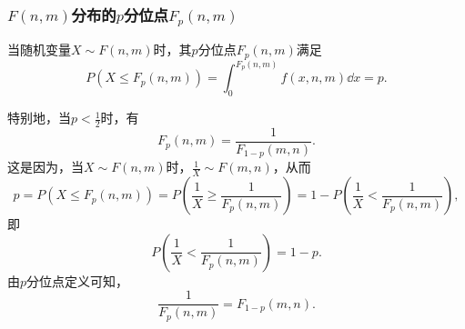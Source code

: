 \subsubsection{\texorpdfstring{\(F(n,m)\)分布的\(p\)分位点\(F_p(n,m)\)}{F分布的p分位点}}
当随机变量\(X \sim F(n,m)\)时，其\(p\)分位点\(F_p(n,m)\)满足\begin{equation*}
P(X \leq F_p(n,m)) = \int_0^{F_p(n,m)} f(x,n,m) \dd{x} = p.
\end{equation*}

特别地，当\(p<\frac{1}{2}\)时，有\begin{equation}
F_p(n,m) = \frac{1}{F_{1-p}(m,n)}.
\end{equation}
这是因为，当\(X \sim F(n,m)\)时，\(\frac{1}{X} \sim F(m,n)\)，从而\begin{equation*}
p = P(X \leq F_p(n,m))
= P\left(\frac{1}{X} \geq \frac{1}{F_p(n,m)}\right)
= 1 - P\left(\frac{1}{X} < \frac{1}{F_p(n,m)}\right),
\end{equation*}即\begin{equation*}
P\left(\frac{1}{X} < \frac{1}{F_p(n,m)}\right) = 1 - p.
\end{equation*}由\(p\)分位点定义可知，\begin{equation*}
\frac{1}{F_p(n,m)} = F_{1-p}(m,n).
\end{equation*}
